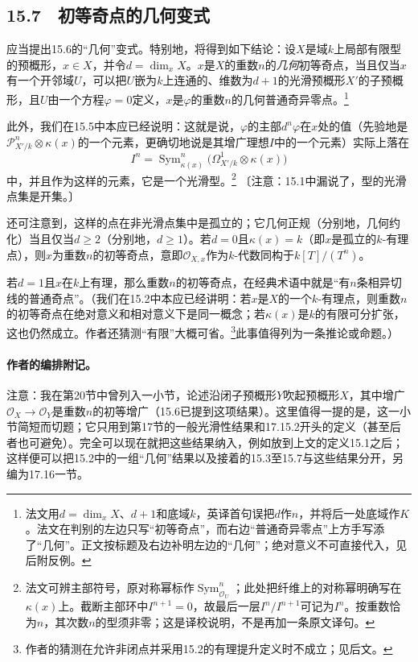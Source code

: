 \subsection*{15.7　初等奇点的几何变式}
\begingroup
\def\OO{\mathcal O}\def\m{\mathfrak m}\def\mm{\mathfrak m}\def\Sym{\operatorname{Sym}}
应当提出15.6的“几何”变式。特别地，将得到如下结论：设$X$是域$k$上局部有限型的预概形，$x\in X$，并令$d=\dim_x X$。$x$是$X$的重数$n$的\emph{几何}初等奇点，当且仅当$x$有一个开邻域$U$，可以把$U$嵌为$k$上连通的、维数为$d+1$的光滑预概形$X'$的子预概形，且$U$由一个方程$\varphi=0$定义，$x$是$\varphi$的重数$n$的几何普通奇异零点。\footnote{法文用$d=\dim_x X$、$d+1$和底域$k$，英译首句误把$d$作$n$，并将后一处底域作$K$。法文在判别的左边只写“初等奇点”，而右边“普通奇异零点”上方手写添了“几何”。正文按标题及右边补明左边的“几何”；绝对意义不可直接代入，见后附反例。}

此外，我们在15.5中本应已经说明：这就是说，$\varphi$的主部$d^n\varphi$在$x$处的值（先验地是$\mathcal P^n_{X'/k}\otimes\kappa(x)$的一个元素，更确切地说是其增广理想$I$中的一个元素）实际上落在
\[
I^n=\Sym^n_{\kappa(x)}
\bigl(\Omega^1_{X'/k}\otimes\kappa(x)\bigr)
\]
中，并且作为这样的元素，它是一个光滑型。\footnote{法文可辨主部符号，原对称幂标作$\Sym^n_{\OO_U}$；此处把纤维上的对称幂明确写在$\kappa(x)$上。截断主部环中$I^{n+1}=0$，故最后一层$I^n/I^{n+1}$可记为$I^n$。按重数恰为$n$，其次数$n$的型须非零；这是译校说明，不是再加一条原文译句。}
〔注意：15.1中漏说了，型的光滑点集是开集。〕

还可注意到，这样的点在非光滑点集中是孤立的；它几何正规（分别地，几何约化）当且仅当$d\ge2$（分别地，$d\ge1$）。若$d=0$且$\kappa(x)=k$（即$x$是孤立的$k$-有理点），则$x$为重数$n$的初等奇点，意即$\OO_{X,x}$作为$k$-代数同构于$k[T]/(T^n)$。

\newpage
若$d=1$且$x$在$k$上有理，那么重数$n$的初等奇点，在经典术语中就是“有$n$条相异切线的普通奇点”。（我们在15.2中本应已经讲明：若$x$是$X$的一个$k$-有理点，则重数$n$的初等奇点在绝对意义和相对意义下是同一概念；若$\kappa(x)$是$k$的有限可分扩张，这也仍然成立。作者还猜测“有限”大概可省。\footnote{作者的猜测在允许非闭点并采用15.2的有理提升定义时不成立；见后文。}此事值得列为一条推论或命题。）

\paragraph{作者的编排附记。}
注意：我在第20节中曾列入一小节，论述沿闭子预概形$Y$吹起预概形$X$，其中增广$\OO_X\to\OO_Y$是重数$n$的初等增广（15.6已提到这项结果）。这里值得一提的是，这一小节简短而切题；它只用到第17节的一般光滑性结果和17.15.2开头的定义（甚至后者也可避免）。完全可以现在就把这些结果纳入，例如放到上文的定义15.1之后；这样便可以把15.2中的一组“几何”结果以及接着的15.3至15.7与这些结果分开，另编为17.16一节。


